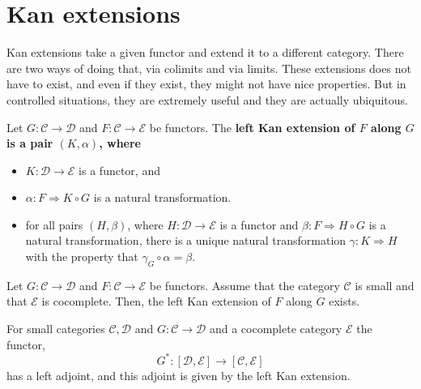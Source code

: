 \section{Kan extensions}

Kan extensions take a given functor and extend it to a different category. There are two ways of doing that, via colimits and via limits. These extensions does not have to exist, and even if they exist, they might not have nice properties. But in controlled situations, they are extremely useful and they are actually ubiquitous.

Let $G: \mathcal{C} \rightarrow \mathcal{D}$ and $F: \mathcal{C} \rightarrow \mathcal{E}$ be functors. The \bf{left Kan extension} of $F$ along $G$ is a pair $(K, \alpha)$, where
\begin{itemize}
    \item $K: \mathcal{D} \rightarrow \mathcal{E}$ is a functor, and
    \item $\alpha: F \Rightarrow K \circ G$ is a natural transformation. %
    \item for all pairs $(H, \beta)$, where $H: \mathcal{D} \rightarrow \mathcal{E}$ is a functor and $\beta: F \Rightarrow H \circ G$ is a natural transformation, there is a unique natural transformation $\gamma: K \Rightarrow H$ with the property that $\gamma_G \circ \alpha=\beta$.
\end{itemize}




\begin{theo}
Let $G: \mathcal{C} \rightarrow \mathcal{D}$ and $F: \mathcal{C} \rightarrow \mathcal{E}$ be functors. Assume that the category $\mathcal{C}$ is small and that $\mathcal{E}$ is cocomplete. Then, the left Kan extension of $F$ along $G$ exists.
\end{theo}

\begin{theo}
For small categories $\mathcal{C}, \mathcal{D}$ and $G: \mathcal{C} \rightarrow \mathcal{D}$ and a cocomplete category $\mathcal{E}$ the functor,
$$
G^*: [\mathcal{D}, \mathcal{E}] \rightarrow [ \mathcal{C}, \mathcal{E}]
$$
has a left adjoint, and this adjoint is given by the left Kan extension.
\end{theo}

